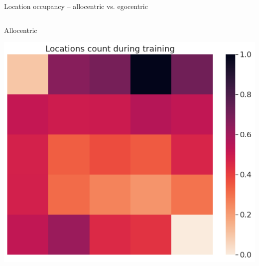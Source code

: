 \documentclass[bigger]{beamer}
\begin{document}
\begin{frame}[label={sec:orge387630}]{Location occupancy -- allocentric vs. egocentric}
\begin{columns}
\begin{column}{0.5\columnwidth}
\footnotesize
\center
\vspace{-1em}
Allocentric
\vspace{-1em}
\begin{center}
\includegraphics[height=0.2\textheight]{img/q-learning_allo_locations_count_all_steps_all_cues.png}
\end{center}


\end{column}
\end{columns}
\end{frame}
\end{document}
